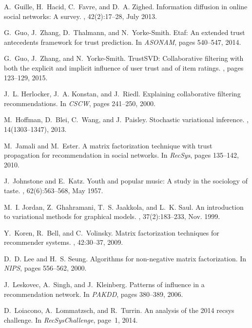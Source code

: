\documentclass{sig-alternate-2013}
\begin{document}
\begin{thebibliography}{10}
A.~Guille, H.~Hacid, C.~Favre, and D.~A. Zighed.
\newblock Information diffusion in online social networks: A survey.
, 42(2):17--28, July 2013.

G.~Guo, J.~Zhang, D.~Thalmann, and N.~Yorke-Smith.
\newblock Etaf: An extended trust antecedents framework for trust prediction.
\newblock In {\em ASONAM}, pages 540--547, 2014.

G.~Guo, J.~Zhang, and N.~Yorke-Smith.
\newblock Trust{SVD}: Collaborative filtering with both the explicit and
  implicit influence of user trust and of item ratings.
, pages 123--129, 2015.

J.~L. Herlocker, J.~A. Konstan, and J.~Riedl.
\newblock Explaining collaborative filtering recommendations.
\newblock In {\em CSCW}, pages 241--250, 2000.

M.~Hoffman, D.~Blei, C.~Wang, and J.~Paisley.
\newblock Stochastic variational inference.
, 14(1303--1347), 2013.

M.~Jamali and M.~Ester.
\newblock A matrix factorization technique with trust propagation for
  recommendation in social networks.
\newblock In {\em RecSys}, pages 135--142, 2010.

J.~Johnstone and E.~Katz.
\newblock Youth and popular music: A study in the sociology of taste.
, 62(6):563--568, May 1957.

M.~I. Jordan, Z.~Ghahramani, T.~S. Jaakkola, and L.~K. Saul.
\newblock An introduction to variational methods for graphical models.
, 37(2):183--233, Nov. 1999.

Y.~Koren, R.~Bell, and C.~Volinsky.
\newblock Matrix factorization techniques for recommender systems.
, 42:30--37, 2009.

D.~D. Lee and H.~S. Seung.
\newblock Algorithms for non-negative matrix factorization.
\newblock In {\em NIPS}, pages 556--562, 2000.

J.~Leskovec, A.~Singh, and J.~Kleinberg.
\newblock Patterns of influence in a recommendation network.
\newblock In {\em PAKDD}, pages 380--389, 2006.

D.~Loiacono, A.~Lommatzsch, and R.~Turrin.
\newblock An analysis of the 2014 recsys challenge.
\newblock In {\em RecSysChallenge}, page~1, 2014.


\end{thebibliography}
\end{document}
